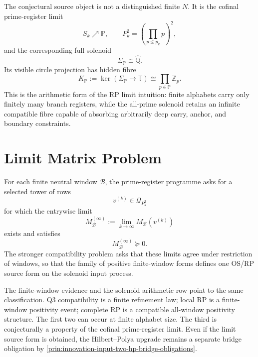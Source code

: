 
\begin{principle}
\label{prin:innovation-input-solenoid-limit-source-reading}
The conjectural source object is not a distinguished finite $N$. It is
the cofinal prime-register limit
$$
S_k\nearrow\mathbb P,
\qquad
P_k^2=\left(\prod_{p\le p_k}p\right)^2,
$$
and the corresponding full solenoid
$$
\Sigma_{\mathbb P}\cong\widehat{\mathbb Q}.
$$
Its visible circle projection has hidden fibre
$$
K_{\mathbb P}:=\ker(\Sigma_{\mathbb P}\to\mathbb T)
\cong
\prod_{p\in\mathbb P}\mathbb Z_p.
$$
This is the arithmetic form of the RP limit intuition: finite alphabets
carry only finitely many branch registers, while the all-prime solenoid
retains an infinite compatible fibre capable of absorbing arbitrarily deep
carry, anchor, and boundary constraints.
\end{principle}

\section{Limit Matrix Problem}
\label{sec:innovation-input-limit-matrix-problem}

\begin{principle}
\label{prob:innovation-input-fixed-window-limit-problem}
For each finite neutral window $\mathcal B$, the prime-register programme
asks for a selected tower of rows
$$
v^{(k)}\in\mathcal Q_{P_k^2}
$$
for which the entrywise limit
$$
M_{\mathcal B}^{(\infty)}
:=
\lim_{k\to\infty}M_{\mathcal B}(v^{(k)})
$$
exists and satisfies
$$
M_{\mathcal B}^{(\infty)}\succeq0.
$$
The stronger compatibility problem asks that these limits agree under
restriction of windows, so that the family of positive finite-window
forms defines one OS/RP source form on the solenoid input process.
\end{principle}

\begin{principle}
\label{prin:innovation-input-complete-rp-limit-property}
The finite-window evidence and the solenoid arithmetic row point to the
same classification. Q3 compatibility is a finite refinement law; local
RP is a finite-window positivity event; complete RP is a compatible
all-window positivity structure. The first two can occur at finite
alphabet size. The third is conjecturally a property of the cofinal
prime-register limit. Even if the limit source form is obtained, the
Hilbert--Polya upgrade remains a separate bridge obligation by
\autoref{prin:innovation-input-two-hp-bridge-obligations}.
\end{principle}
